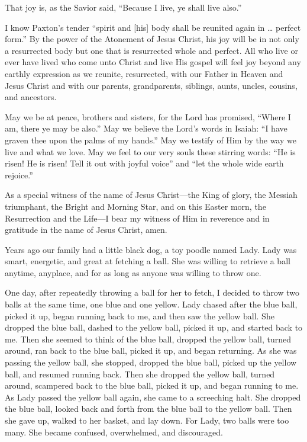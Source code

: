 \documentclass[letterpaper, 11pt]{report}
\newcommand{\speaker}{}
\newcommand{\talk}{}
\newcommand{\talkdatestr}{}
\newcommand{\setspeaker}[1]{\renewcommand{\speaker}{#1}}
\newcommand{\settalk}[1]{\renewcommand{\talk}{#1}}
\newcommand{\talkheading}[2]{%
    \vspace{1em}
    \noindent{\huge\bfseries #1}
    \par\nopagebreak\vspace{0.25em}
    \noindent{\normalsize\bfseries #2\ifx\talkdatestr\empty\else,\ \talkdatestr\fi}
    \par\nopagebreak\vspace{0.5em}
}
\begin{document}
That joy is, as the Savior said, “Because I live, ye shall live also.”

I know Paxton’s tender “spirit and [his] body shall be reunited again in … perfect form.” By the power of the Atonement of Jesus Christ, his joy will be in not only a resurrected body but one that is resurrected whole and perfect. All who live or ever have lived who come unto Christ and live His gospel will feel joy beyond any earthly expression as we reunite, resurrected, with our Father in Heaven and Jesus Christ and with our parents, grandparents, siblings, aunts, uncles, cousins, and ancestors.

May we be at peace, brothers and sisters, for the Lord has promised, “Where I am, there ye may be also.” May we believe the Lord’s words in Isaiah: “I have graven thee upon the palms of my hands.” May we testify of Him by the way we live and what we love. May we feel to our very souls these stirring words: “He is risen! He is risen! Tell it out with joyful voice” and “let the whole wide earth rejoice.”

As a special witness of the name of Jesus Christ—the King of glory, the Messiah triumphant, the Bright and Morning Star, and on this Easter morn, the Resurrection and the Life—I bear my witness of Him in reverence and in gratitude in the name of Jesus Christ, amen.

\newpage
\settalk{Because of Jesus Christ}
\setspeaker{Dale G. Renlund}
\talkheading{Because of Jesus Christ}{Dale G. Renlund}

Years ago our family had a little black dog, a toy poodle named Lady. Lady was smart, energetic, and great at fetching a ball. She was willing to retrieve a ball anytime, anyplace, and for as long as anyone was willing to throw one.

One day, after repeatedly throwing a ball for her to fetch, I decided to throw two balls at the same time, one blue and one yellow. Lady chased after the blue ball, picked it up, began running back to me, and then saw the yellow ball. She dropped the blue ball, dashed to the yellow ball, picked it up, and started back to me. Then she seemed to think of the blue ball, dropped the yellow ball, turned around, ran back to the blue ball, picked it up, and began returning. As she was passing the yellow ball, she stopped, dropped the blue ball, picked up the yellow ball, and resumed running back. Then she dropped the yellow ball, turned around, scampered back to the blue ball, picked it up, and began running to me. As Lady passed the yellow ball again, she came to a screeching halt. She dropped the blue ball, looked back and forth from the blue ball to the yellow ball. Then she gave up, walked to her basket, and lay down. For Lady, two balls were too many. She became confused, overwhelmed, and discouraged.
\end{document}
